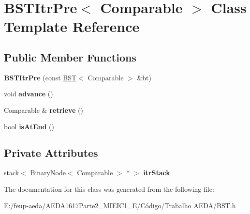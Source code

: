 \hypertarget{class_b_s_t_itr_pre}{}\section{B\+S\+T\+Itr\+Pre$<$ Comparable $>$ Class Template Reference}
\label{class_b_s_t_itr_pre}
\subsection*{Public Member Functions}
\begin{DoxyCompactItemize}
\item 
\mbox{\label{class_b_s_t_itr_pre_a11b1cd4e783f153b9c1b64ce2ec8077e}} 
{\bfseries B\+S\+T\+Itr\+Pre} (const \hyperlink{class_b_s_t}{B\+ST}$<$ Comparable $>$ \&bt)
\item 
\mbox{\label{class_b_s_t_itr_pre_a7a743d66a842018fd833fb2b0737254d}} 
void {\bfseries advance} ()
\item 
\mbox{\label{class_b_s_t_itr_pre_af40033e97f63bf025c2e33a9fdce4c43}} 
Comparable \& {\bfseries retrieve} ()
\item 
\mbox{\label{class_b_s_t_itr_pre_ae282a7b9ffa9d250bb0f6a6d79f6e8d0}} 
bool {\bfseries is\+At\+End} ()
\end{DoxyCompactItemize}
\subsection*{Private Attributes}
\begin{DoxyCompactItemize}
\item 
\mbox{\label{class_b_s_t_itr_pre_a73e938d809acba06490472e7fc1bd6d3}} 
stack$<$ \hyperlink{class_binary_node}{Binary\+Node}$<$ Comparable $>$ $\ast$ $>$ {\bfseries itr\+Stack}
\end{DoxyCompactItemize}


The documentation for this class was generated from the following file\+:\begin{DoxyCompactItemize}
\item 
E\+:/feup-\/aeda/\+A\+E\+D\+A1617\+Parte2\+\_\+M\+I\+E\+I\+C1\+\_\+\+E/\+Código/\+Trabalho A\+E\+D\+A/B\+S\+T.\+h\end{DoxyCompactItemize}
